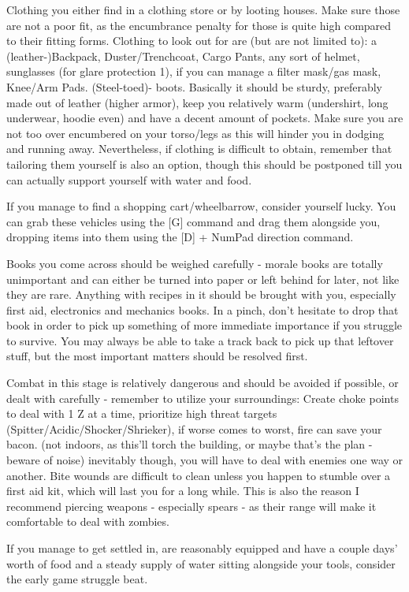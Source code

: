 Clothing you either find in a clothing store or by looting houses. Make sure those are not a poor fit, as the encumbrance penalty for those is quite high compared to their fitting forms. Clothing to look out for are (but are not limited to): a (leather-)Backpack, Duster/Trenchcoat, Cargo Pants, any sort of helmet, sunglasses (for glare protection 1), if you can manage a filter mask/gas mask, Knee/Arm Pads. (Steel-toed)- boots. Basically it should be sturdy, preferably made out of leather (higher armor), keep you relatively warm (undershirt, long underwear, hoodie even) and have a decent amount of pockets. Make sure you are not too over encumbered on your torso/legs as this will hinder you in dodging and running away. Nevertheless, if clothing is difficult to obtain, remember that tailoring them yourself is also an option, though this should be postponed till you can actually support yourself with water and food.

If you manage to find a shopping cart/wheelbarrow, consider yourself lucky. You can grab these vehicles using the [G] command and drag them alongside you, dropping items into them using the [D] + NumPad direction command.

Books you come across should be weighed carefully - morale books are totally unimportant and can either be turned into paper or left behind for later, not like they are rare. Anything with recipes in it should be brought with you, especially first aid, electronics and mechanics books. In a pinch, don't hesitate to drop that book in order to pick up something of more immediate importance if you struggle to survive. You may always be able to take a track back to pick up that leftover stuff, but the most important matters should be resolved first.

Combat in this stage is relatively dangerous and should be avoided if possible, or dealt with carefully - remember to utilize your surroundings: Create choke points to deal with 1 Z at a time, prioritize high threat targets (Spitter/Acidic/Shocker/Shrieker), if worse comes to worst, fire can save your bacon. (not indoors, as this'll torch the building, or maybe that's the plan - beware of noise) inevitably though, you will have to deal with enemies one way or another. Bite wounds are difficult to clean unless you happen to stumble over a first aid kit, which will last you for a long while. This is also the reason I recommend piercing weapons - especially spears - as their range will make it comfortable to deal with zombies.

If you manage to get settled in, are reasonably equipped and have a couple days' worth of food and a steady supply of water sitting alongside your tools, consider the early game struggle beat.

